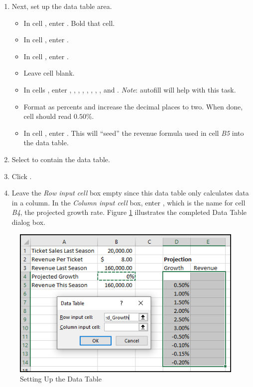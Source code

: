 \begin{enumerate}[resume]
	 
	\item Next, set up the data table area.

\begin{itemize}
	\item In cell , enter . Bold that cell.
	\item In cell , enter .
	\item In cell , enter .
	\item Leave cell  blank.
	\item In cells , enter , , , , , , , ,  and . \textit{Note}: autofill will help with this task.
	\item Format  as percents and increase the decimal places to two. When done, cell  should read $ 0.50 $\%.
	\item In cell , enter . This will ``seed'' the revenue formula used in cell \textit{B5} into the data table.
\end{itemize}

	\item Select  to contain the data table.
	\item Click .
	\item Leave the \textit{Row input cell} box empty since this data table only calculates data in a column. In the \textit{Column input cell} box, enter , which is the name for cell \textit{B4}, the projected growth rate. Figure \ref{08:fig41} illustrates the completed Data Table dialog box.
	
\end{enumerate}

\begin{figure}[H]
	\centering
	\includegraphics[width=\maxwidth{.95\linewidth}]{gfx/ch08_fig41}
	\caption{Setting Up the Data Table}
	\label{08:fig41}
\end{figure}

